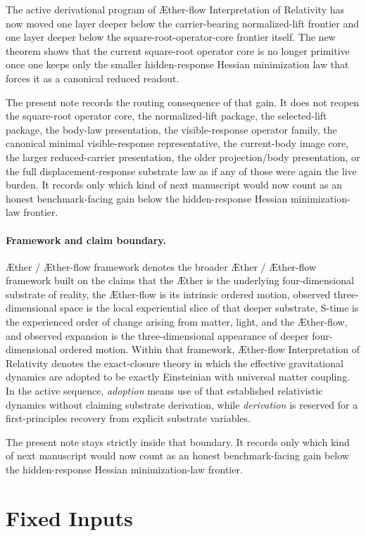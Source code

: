 \documentclass[11pt]{article}
\newcommand{\Aether}{\AE{}ther}
\newcommand{\Aflow}{\AE{}ther-flow}
\newcommand{\TheoryName}{\Aflow{} Interpretation of Relativity}
\newcommand{\TheoryProgram}{\Aether{} / \Aflow{} framework}
\begin{document}
The active derivational program of \TheoryName{} has now moved one layer deeper below the carrier-bearing normalized-lift frontier and one layer deeper below the square-root-operator-core frontier itself. The new theorem shows that the current square-root operator core is no longer primitive once one keeps only the smaller hidden-response Hessian minimization law that forces it as a canonical reduced readout.

The present note records the routing consequence of that gain. It does not reopen the square-root operator core, the normalized-lift package, the selected-lift package, the body-law presentation, the visible-response operator family, the canonical minimal visible-response representative, the current-body image core, the larger reduced-carrier presentation, the older projection/body presentation, or the full displacement-response substrate law as if any of those were again the live burden. It records only which kind of next manuscript would now count as an honest benchmark-facing gain below the hidden-response Hessian minimization-law frontier.

\paragraph{Framework and claim boundary.}
\TheoryProgram{} denotes the broader \Aether{} / \Aflow{} framework built on the claims that the \Aether{} is the underlying four-dimensional substrate of reality, the \Aflow{} is its intrinsic ordered motion, observed three-dimensional space is the local experiential slice of that deeper substrate, S-time is the experienced order of change arising from matter, light, and the \Aflow{}, and observed expansion is the three-dimensional appearance of deeper four-dimensional ordered motion. Within that framework, \TheoryName{} denotes the exact-closure theory in which the effective gravitational dynamics are adopted to be exactly Einsteinian with universal matter coupling. In the active sequence, \emph{adoption} means use of that established relativistic dynamics without claiming substrate derivation, while \emph{derivation} is reserved for a first-principles recovery from explicit substrate variables.

The present note stays strictly inside that boundary. It records only which kind of next manuscript would now count as an honest benchmark-facing gain below the hidden-response Hessian minimization-law frontier.

\section{Fixed Inputs}
\end{document}
